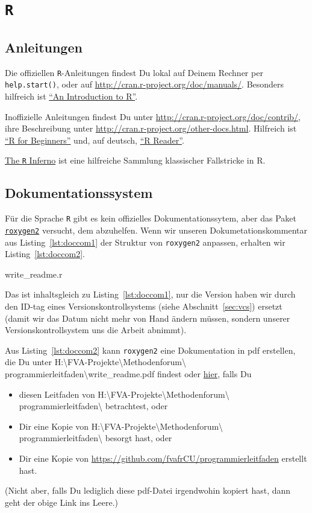 \documentclass[twoside]{scrreprt}
\providecommand{\R}{\texttt{R}}
\providecommand{\code}[1]{\texttt{#1}}
\providecommand{\proot}{%
H:\textbackslash{}FVA-Projekte\textbackslash{}Methodenforum\textbackslash{}%
}
\providecommand{\pdir}{\proot{}programmierleitfaden\textbackslash{}}
\begin{document}
\section{\R{}}
\subsection{Anleitungen }
Die offiziellen  \R{}-Anleitungen findest Du lokal auf Deinem Rechner per
\code{help.start()}, oder auf \url{http://cran.r-project.org/doc/manuals/}.
Besonders hilfreich ist
\linebreak{}
\href{http://cran.r-project.org/doc/manuals/r-release/R-intro.pdf}
{"`An Introduction to R"'}.

Inoffizielle Anleitungen findest Du unter
\url{http://cran.r-project.org/doc/contrib/}, ihre Beschreibung unter
\url{http://cran.r-project.org/other-docs.html}. Hilfreich ist
\href{http://cran.r-project.org/doc/contrib/Paradis-rdebuts_en.pdf}
{"`R for Beginners"'}
und, auf deutsch,
\href{http://cran.r-project.org/doc/contrib/Grosz+Peters-R-Reader.pdf}
{"`R Reader"'}.

\href{http://www.burns-stat.com/pages/Tutor/R_inferno.pdf}{The \R{} Inferno} ist
eine hilfreiche Sammlung klassischer Fallstricke in R.

\subsection{Dokumentationssystem}
F\"u{}r die Sprache \R{}
gibt es kein offizielles Dokumentationssytem, aber
das Paket \href{http://cran.r-project.org/web/packages/roxygen2/index.html}
{\code{roxygen2}} versucht, dem abzuhelfen.
Wenn wir unseren Dokumetationskommentar aus Listing~\ref{lst:doccom1} der
Struktur von \code{roxygen2} anpassen, erhalten wir Listing~\ref{lst:doccom2}.

%
{write_readme.r}

Das ist inhaltsgleich zu  Listing~\ref{lst:doccom1}, nur die Version haben wir
durch den ID-tag eines Versionskontrollsystems (siehe Abschnitt~\ref{sec:vcs})
ersetzt (damit wir das Datum nicht mehr von Hand
\"a{}ndern m\"u{}ssen, sondern unserer Versionskontrollsystem uns die Arbeit
abnimmt).

Aus Listing~\ref{lst:doccom2}  kann \code{roxygen2} eine Dokumentation in pdf
erstellen, die Du unter \pdir{}write\_readme.pdf findest oder
\href{write_readme.pdf}{hier\label{page:links}}, falls Du  
\begin{itemize}
    \item diesen Leitfaden von \pdir{} betrachtest, oder 
    \item Dir eine Kopie von \pdir{} besorgt hast, oder 
    \item Dir eine Kopie von 
        \url{https://github.com/fvafrCU/programmierleitfaden} erstellt hast.
\end{itemize}
(Nicht aber, falls Du lediglich diese pdf-Datei irgendwohin kopiert hast, dann 
geht der obige Link ins Leere.)
\end{document}
